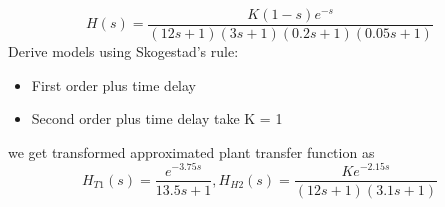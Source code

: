 \message{ !name(lab1.tex)}\documentclass[a4paper,12pt,openany]{book}
\begin{document}
  \par
 \noindent {}
 \begin{equation}
   H(s) = \frac{K(1 - s)e^{-s}}{(12s+1)(3s+1)(0.2s+1)(0.05s+1)}
 \end{equation}
   \noindent Derive models using Skogestad's rule:
   \begin{itemize}
   \item First order plus time delay
   \item Second order plus time delay take K = 1
 \end{itemize}
   \par
   we get transformed approximated plant transfer function as
\begin{equation}
   H_{T1}(s)= \frac{e^{-3.75s}}{13.5s + 1},  H_{H2}(s) = \frac{Ke^{-2.15s}}{(12s + 1)(3.1s + 1)}
 \end{equation}
\end{document}
